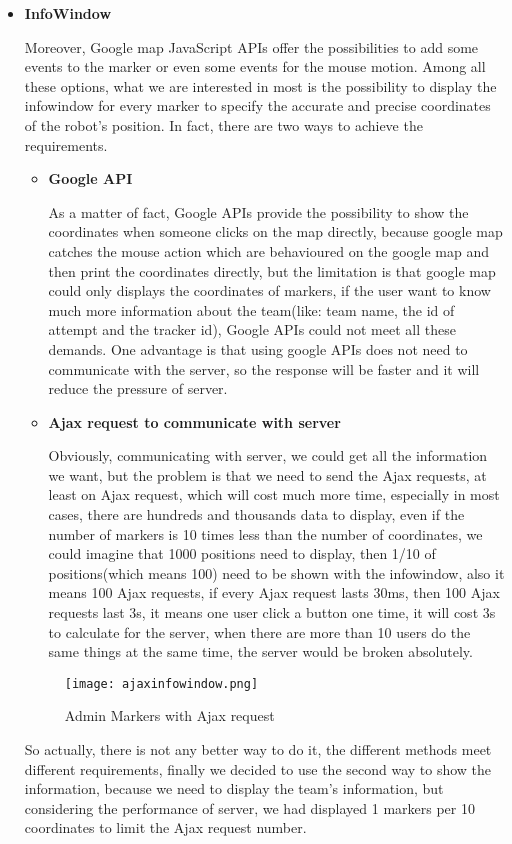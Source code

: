 \begin{itemize}
\item{\textbf{InfoWindow}}


Moreover, Google map JavaScript APIs offer the possibilities to add some events to the marker or even some events for the mouse motion. Among all these options, what we are interested in most is the possibility to display the infowindow for every marker to specify the accurate and precise coordinates of the robot's position. In fact, there are two ways to achieve the requirements.
\begin{itemize}
\item{\textbf{Google API}}


As a matter of fact, Google APIs provide the possibility to show the coordinates when someone clicks on the map directly, because google map catches the mouse action which are behavioured on the google map and then print the coordinates directly, but the limitation is that google map could only displays the coordinates of markers, if the user want to know much more information about the team(like: team name, the id of attempt and the tracker id), Google APIs could not meet all these demands. One advantage is that using google APIs does not need to communicate with the server, so the response will be faster and it will reduce the pressure of server.



\item{\textbf{Ajax request to communicate with server}}


Obviously, communicating with server, we could get all the information we want, but the problem is that we need to send the Ajax requests, at least on Ajax request, which will cost much more time, especially in most cases, there are hundreds and thousands data to display, even if the number of markers is 10 times less than the number of coordinates, we could imagine that 1000 positions need to display, then 1/10 of positions(which means 100) need to be shown with the infowindow, also it means 100 Ajax requests, if every Ajax request lasts 30ms, then 100 Ajax requests last 3s, it means one user click a button one time, it will cost 3s to calculate for the server, when there are more than 10 users do the same things at the same time, the server would be broken absolutely.

\end{itemize}

\begin{figure}[h!]
\centering
\texttt{[image: ajaxinfowindow.png]}
\caption{Admin Markers with Ajax request}
\label{fig-sample}
\end{figure}

So actually, there is not any better way to do it, the different methods meet different requirements, finally we decided to use the second way to show the information, because we need to display the team's information, but considering the performance of server, we had displayed 1 markers per 10 coordinates to limit the Ajax request number.
\end{itemize}